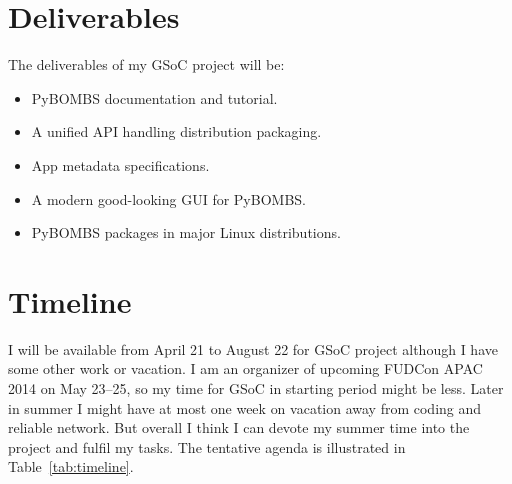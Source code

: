 \documentclass[a4paper]{article}
\begin{document}
\section{Deliverables}

The deliverables of my GSoC project will be:
\begin{itemize}
  \item PyBOMBS documentation and tutorial.
  \item A unified API handling distribution packaging.
  \item App metadata specifications.
  \item A modern good-looking GUI for PyBOMBS.
  \item PyBOMBS packages in major Linux distributions.
\end{itemize}

\section{Timeline}

I will be available from April 21 to August 22 for GSoC project although
I have some other work or vacation.  I am an organizer of upcoming
FUDCon APAC 2014 on May 23--25, so my time for GSoC in starting period
might be less.  Later in summer I might have at most one week on
vacation away from coding and reliable network.  But overall I think I
can devote my summer time into the project and fulfil my tasks.  The
tentative agenda is illustrated in Table~\ref{tab:timeline}.
\end{document}

